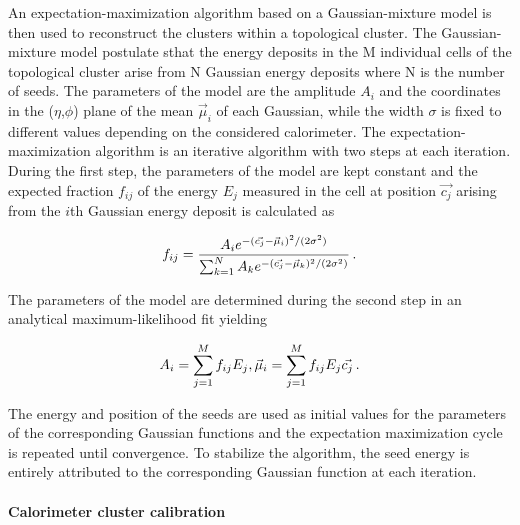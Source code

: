 An expectation-maximization algorithm based on a Gaussian-mixture model is then used to reconstruct the clusters within a topological cluster.  The Gaussian-mixture model postulate sthat the energy deposits in the M individual cells of the topological cluster arise from N Gaussian energy deposits where N is the number of seeds.  The parameters of the model are the amplitude $A_i$ and the coordinates in the ($\eta$,$\phi$) plane of the mean $\Vec{\mu}_i$ of each Gaussian, while the width $\sigma$ is fixed to different values depending on the considered calorimeter. The expectation-maximization algorithm is an iterative algorithm with two steps at each iteration.  During the first step, the parameters of the model are kept constant and the expected fraction $f_{ij}$ of the energy $E_j$ measured in the cell at position $\Vec{c_j}$ arising from the $i$th Gaussian energy deposit is calculated as

\begin{equation}
    f_{ij} = \frac{A_i e^{-(\Vec{c_j}-\Vec{\mu}_i)^2 / (2\sigma^2)}}{\sum_{k=1}^N A_k e^{-(\Vec{c_j}-\Vec{\mu}_k)^2 / (2\sigma^2)}} \mend
\end{equation}

The parameters of the model are determined during the second step in an analytical maximum-likelihood fit yielding

\begin{equation}
    A_i = \sum_{j=1}^M f_{ij}E_j , \Vec{\mu}_i = \sum_{j=1}^M f_{ij}E_j \Vec{c_j} \mend
\end{equation}

The energy and position of the seeds are used as initial values for the parameters of the corresponding Gaussian functions and the expectation maximization cycle is repeated until convergence.  To stabilize the algorithm, the seed energy is entirely attributed to the corresponding Gaussian function at each iteration.

\paragraph{Calorimeter cluster calibration}

